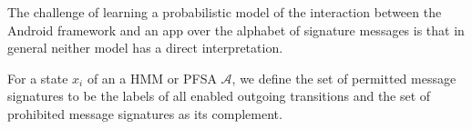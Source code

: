 \documentclass[10pt,reprint,nocopyrightspace,numbers]{sigplanconf}
\begin{document}
%
The challenge of learning a probabilistic model of the interaction between the 
Android framework and an app over the alphabet of signature messages 
is that in general neither model has a direct interpretation.
  
%
For a state $x_i$ of an 
a HMM or PFSA $\mathcal{A}$, we define the set of permitted message signatures 
to be the labels of all enabled outgoing transitions 
and the set of prohibited message signatures as its complement. %
\end{document}
